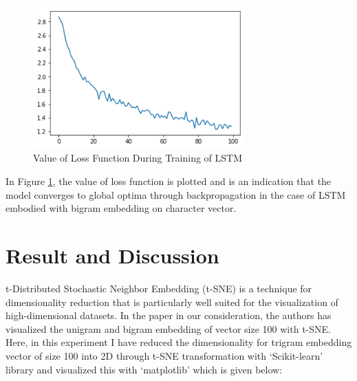 \documentclass[a4paper]{article}
\begin{document}
\begin{figure}[ht!]
	\centering
	\includegraphics[width = 0.5\columnwidth, height = 5.5cm]{loss.png}
	\caption{Value of Loss Function During Training of LSTM}
	\label{fig:loss}
\end{figure}

In Figure \ref{fig:loss}, the value of loss function is plotted and is an indication that the model converges to global optima through backpropagation in the case of LSTM embodied with bigram embedding on character vector. 

\section*{Result and Discussion}
t-Distributed Stochastic Neighbor Embedding (t-SNE) is a technique for dimensionality reduction that is particularly well suited for the visualization of high-dimensional datasets. In the paper \cite{lee2017name} in our consideration, the authors has visualized the unigram and bigram embedding of vector size 100 with t-SNE. Here, in this experiment I have reduced the dimensionality for trigram embedding vector of size 100 into 2D through t-SNE transformation with `Scikit-learn' library and visualized this with `matplotlib' which is given below: 
\\
\end{document}

